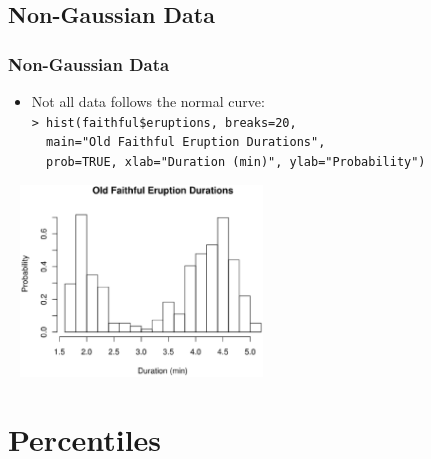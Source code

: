 \documentclass[t]{beamer}
\begin{document}
\subsection{Non-Gaussian Data}
\begin{frame}[t]\frametitle{Non-Gaussian Data}

{\small
\begin{itemize}
\item Not all data follows the normal curve:\\[5pt]
 \texttt{> hist(faithful\$eruptions, breaks=20,}\\
 \texttt{\ \ main="Old Faithful Eruption Durations",}\\
 \texttt{\ \ prob=TRUE, xlab="Duration (min)", ylab="Probability")}\vspace{-5pt}
\end{itemize}
\begin{center}
{\ }\hspace{.1in}
\hspace{.2in}
\includegraphics[height=2in]{faithful.eps}
\end{center}
}
\end{frame}


\section{Percentiles}
\end{document}

